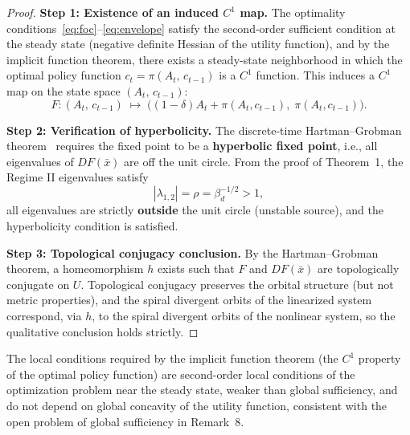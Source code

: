 \documentclass[12pt]{article}
\begin{document}
\begin{proof}
        \textbf{Step 1: Existence of an induced $C^1$ map.}\;
    The optimality conditions~\eqref{eq:foc}--\eqref{eq:envelope}
    satisfy the second-order sufficient condition at the steady state (negative definite Hessian of the utility function),
    and by the implicit function theorem, there exists a steady-state neighborhood in which the optimal policy function
    $c_t = \pi(A_t,\,c_{t-1})$ is a $C^1$ function.
    This induces a $C^1$ map on the state space $(A_t,\,c_{t-1})$:
    \[
        F\colon (A_t,\,c_{t-1})
        \;\mapsto\;
        \bigl((1-\delta)A_t + \pi(A_t,c_{t-1}),\;\pi(A_t,c_{t-1})\bigr).
    \]
 
        \textbf{Step 2: Verification of hyperbolicity.}\;
    The discrete-time Hartman--Grobman theorem~\cite{Hartman1960, Devaney1989}
    requires the fixed point to be a \textbf{hyperbolic fixed point}, i.e., all eigenvalues of $DF(\bar{x})$
    are off the unit circle.
    From the proof of Theorem~1, the Regime II eigenvalues satisfy
    \[
        |\lambda_{1,2}| = \rho = \beta_d^{-1/2} > 1,
    \]
    all eigenvalues are strictly \textbf{outside} the unit circle (unstable source), and the hyperbolicity condition is satisfied.
 
        \textbf{Step 3: Topological conjugacy conclusion.}\;
    By the Hartman--Grobman theorem, a homeomorphism $h$ exists such that $F$ and $DF(\bar{x})$
    are topologically conjugate on $U$. Topological conjugacy preserves the orbital structure (but not metric properties),
    and the spiral divergent orbits of the linearized system correspond, via $h$, to the spiral divergent orbits of the nonlinear system,
    so the qualitative conclusion holds strictly.
\end{proof}
The local conditions required by the implicit function theorem (the $C^1$ property of the optimal policy function)
are second-order local conditions of the optimization problem near the steady state, weaker than global sufficiency,
and do not depend on global concavity of the utility function, consistent with the open problem of global sufficiency in Remark~8.
\end{document}
